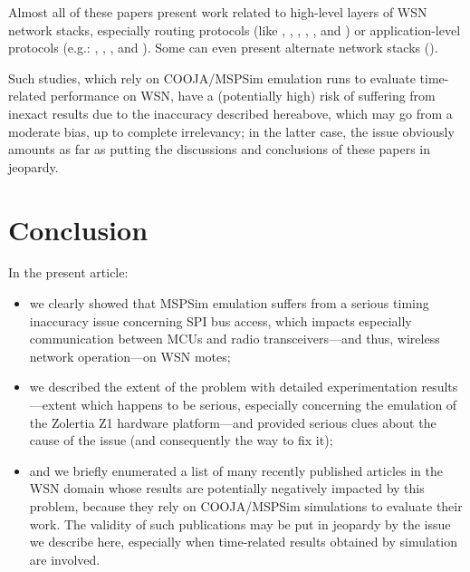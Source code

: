 \documentclass[a4paper,10pt]{article}
\begin{document}
Almost all of these papers present work related to high-level layers
of WSN network stacks, especially routing protocols (like
\cite{Constrain-Routing-Trees-2014}, \cite{Contiki-RPL-Eval-2014},
\cite{Co-RPL-2014}, \cite{IETF-Routing-WSN-2014},
\cite{RPL-GreenHouse-Convgc-Time-2014}, and \cite{Trickle-L2-2014})
or application-level protocols (e.g.: \cite{DINAS-2014},
\cite{Efficient-Distrib-Svc-Discovery-2014}, \cite{Key-Mgmt-2015},
and \cite{Visual-Sensor-Networks-2014}).
Some can even present alternate network stacks (\cite{TinySDN-2014}).

\medskip

Such studies, which rely on COOJA/MSPSim emulation runs to evaluate
time-related performance on WSN, have a (potentially high) risk of
suffering from inexact results due to the inaccuracy described hereabove,
which may go from a moderate bias, up to complete irrelevancy; in the latter
case, the issue obviously amounts as far as putting the discussions and
conclusions of these papers in jeopardy.


\section{Conclusion}

In the present article:
\begin{itemize}
\item we clearly showed that MSPSim emulation suffers from a serious timing
inaccuracy issue concerning SPI bus access, which impacts especially
communication between MCUs and radio transceivers---and thus, wireless
network operation---on WSN motes;
\item we described the extent of the problem with detailed experimentation
results---extent which happens to be serious, especially concerning the
emulation of the Zolertia Z1 hardware platform---and provided serious clues
about the cause of the issue (and consequently the way to fix it);
\item and we briefly enumerated a list of many recently published articles
in the WSN domain whose results are potentially negatively impacted by this
problem, because they rely on COOJA/MSPSim simulations to evaluate their work.
The validity of such publications may be put in jeopardy by the
issue we describe here, especially when time-related results
obtained by simulation are involved.
\end{itemize}
\end{document}
